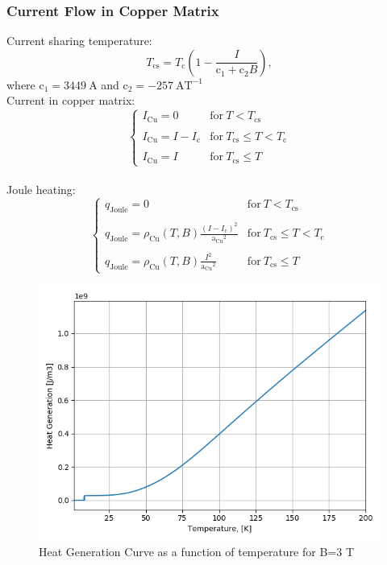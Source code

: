 \documentclass{article}
\begin{document}
    \subsubsection{Current Flow in Copper Matrix}
    
    Current sharing temperature: 
    \begin{equation}
        T_\text{cs} = T_\text{c} (1 - \frac{I}{\text{c}_1 + \text{c}_2 B }),
    \end{equation}
    where $\text{c}_1=3449~\text{A}$ and $\text{c}_2=-257~\text{AT}^{-1}$
    \\
    Current in copper matrix: 
    \begin{equation}
        \left\{ \begin{array}{lll}
        I_\text{Cu} = 0 & \text{for}~T < T_\text{cs} \\ \\
        I_\text{Cu} = I - I_\text{c} & \text{for}~T_\text{cs} \leq T<T_\text{c}  \\ \\
        I_\text{Cu} = I & \text{for}~T_\text{cs} \leq T
        \end{array} \right.
    \end{equation}
    \\
    Joule heating: 
    \begin{equation}
        \left\{ \begin{array}{lll}
        q_\text{Joule} = 0 & \text{for}~T < T_\text{cs} \\ \\
        q_\text{Joule} = \rho_\text{Cu}(T, B) \frac{(I-I_\text{c})^2}{{\text{a}_\text{Cu}}^2}& \text{for}~T_\text{cs} \leq T<T_\text{c}  \\ \\
        q_\text{Joule} = \rho_\text{Cu}(T, B) \frac{I^2}{{\text{a}_\text{Cu}}^2} & \text{for}~T_\text{cs} \leq T
        \end{array} \right.
    \end{equation}

    \begin{figure}[ht!]
    \centering
    \includegraphics[width=0.49\linewidth]{figures/skew_quad_bcs/magnetic_field_mapping/Heat_Generation_Curve_B_3.png}
    \caption{Heat Generation Curve as a function of temperature for B=3 T}
    \label{fig:H_gen_curve}
    \end{figure}
    
\end{document}
